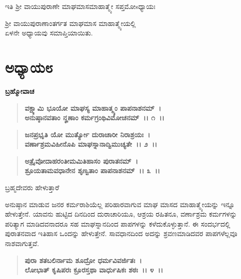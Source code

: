 \begin{center}
ಇತಿ ಶ‍್ರೀ ವಾಯುಪುರಾಣೇ ಮಾಘಮಾಸಮಾಹಾತ್ಮ್ಯೇ ಸಪ್ತಮೋsಧ್ಯಾಯಃ 
\end{center}

\begin{center}
ಶ‍್ರೀ ವಾಯುಪುರಾಣಾಂತರ್ಗತ ಮಾಘಮಾಸ ಮಾಹಾತ್ಮ್ಯೇಯಲ್ಲಿ \\ ಏಳನೇ ಅಧ್ಯಾಯವು ಸಮಾಪ್ತಿಯಾಯಿತು.
\end{center}

\newpage

\section*{ಅಧ್ಯಾಯ\enginline{-}೮}

\emptypage

\begin{flushleft}
\textbf{ಬ್ರಹ್ಮೋವಾಚ\enginline{-} }
\end{flushleft}

\begin{verse}
\textbf{ವಕ್ಷ್ಯಾಮಿ ಭೂಯೋ ಮಾಘಸ್ಯ ಮಾಹಾತ್ಮ್ಯಂ ಪಾಪನಾಶನಮ್~।}\\\textbf{ಅನುಷ್ಠಾನವತಾಂ ನೄಣಾಂ ಕರ್ಮಗ್ರಂಥಿವಿಮೋಚನಮ್~।। ೧~।। }
\end{verse}

\begin{verse}
\textbf{ಜನಪ್ರಭೃತಿ ಯೋ ಮುರ್ತ್ಯೋ ದುರಾಚಾರೀ ನಿರಾಶ್ರಯಃ~।}\\\textbf{ವರ್ಣಾಶ್ರಮವಿಹೀನೊಪಿ ಮಾಘಸ್ನಾನಾದ್ವಿಮುಚ್ಯತೇ~।। ೨~।।}
\end{verse}

\begin{verse}
\textbf{ಅತ್ರೈವೋದಾಹರಂತೀಮಮಿತಿಹಾಸಂ ಪುರಾತನಮ್~।}\\\textbf{ಶ್ರೂಯತಾಮವಧಾನೇನ ಶೃಣ್ವತಾಂ ಪಾಪನಾಶನಮ್~।। ೩~।। }
\end{verse}

\begin{flushleft}
ಬ್ರಹ್ಮದೇವರು ಹೇಳುತ್ತಾರೆ
\end{flushleft}

ಅನುಷ್ಠಾನ ಮಾಡುವ ಜನರ ಕರ್ಮರಾಶಿಯೆಲ್ಲ ಪರಿಹಾರವಾಗುವ ಮಾಘ ಮಾಸದ ಮಾಹಾತ್ಮ್ಯೇಯನ್ನು ಇನ್ನೂ ಹೇಳುತ್ತೇನೆ. ಯಾವನು ಹುಟ್ಟಿದ ದಿನದಿಂದ ದುರಾಚಾರಿಯೂ, ಆಶ್ರಯ ರಹಿತನೂ, ವರ್ಣಾಶ್ರಮ ಕರ್ಮಗಳನ್ನು ಪರಿತ್ಯಾಗ ಮಾಡಿದವನಾದರೂ ಸಹ ಮಾಘಸ್ನಾನದಿಂದ ಪಾಪಗಳನ್ನು ಕಳೆದುಕೊಳ್ಳುತ್ತಾನೆ. ಈ ಸಂದರ್ಭದಲ್ಲಿ ಪುರಾತನವಾದ ಇತಿಹಾಸ ಒಂದನ್ನು ಹೇಳುತ್ತೇನೆ. ಸಾವಧಾನದಿಂದ ಅದನ್ನು ಶ್ರವಣಮಾಡಿದವರ ಪಾಪಗಳೆಲ್ಲವೂ ನಾಶವಾಗುತ್ತವೆ.

\begin{verse}
\textbf{ಪುರಾ ಶತಬಲಿರ್ನಾಮ ಶೂದ್ರೋ ಧರ್ಮವಿವರ್ಜಿತಃ~।}\\\textbf{ಲೋಭಾತ್ ಕೃಷಿಪರಃ ಕ್ರೂರಸ್ತಥಾ ವಾರ್ಧುಷಿಕಃ ಶಠಃ~।। ೪~।। }
\end{verse}

